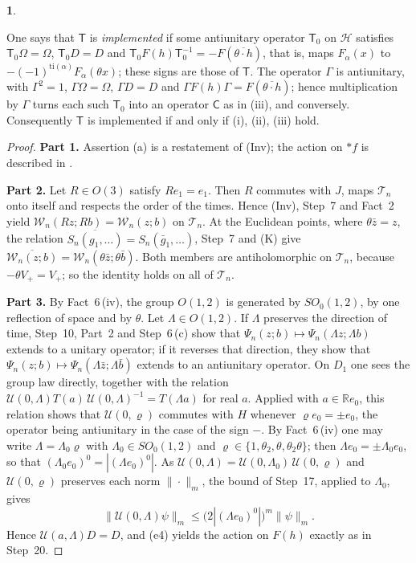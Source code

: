 \documentclass[11pt]{amsart}
\newcommand{\namedhead}{}
\theoremstyle{definition}
\newtheorem*{namedinner}{\namedhead}
\newenvironment{named}[1]{\renewcommand{\namedhead}{#1}\begin{namedinner}}{\end{namedinner}}
\begin{document}
\begin{named}{Proposition 3.5}
\begin{itemize}
One says that $\mathsf T$ is \emph{implemented} if some antiunitary operator $\mathsf T_0$ on $\mathcal H$ satisfies $\mathsf T_0\Omega=\Omega$, $\mathsf T_0D=D$ and $\mathsf T_0F(h)\mathsf T_0^{-1}=-F(\overline{\theta\cdot h})$, that is, maps $F_\alpha(x)$ to $-(-1)^{\mathrm{ti}(\alpha)}F_\alpha(\theta x)$; these signs are those of $\mathsf T$.
The operator $\Gamma$ is antiunitary, with $\Gamma^2=1$, $\Gamma\Omega=\Omega$, $\Gamma D=D$ and $\Gamma F(h)\Gamma=F(\overline{\theta\cdot h})$; hence multiplication by $\Gamma$ turns each such $\mathsf T_0$ into an operator $\mathsf C$ as in (iii), and conversely.
Consequently $\mathsf T$ is implemented if and only if (i), (ii), (iii) hold.
\end{itemize}
\end{named}

\begin{proof}
\textbf{Part 1.}
Assertion (a) is a restatement of (Inv); the action on $\ast f$ is described in \cite[Definition~14.1]{QEDII}.

\textbf{Part 2.}
Let $R\in O(3)$ satisfy $Re_1=e_1$.
Then $R$ commutes with $J$, maps $\mathcal T_n$ onto itself and respects the order of the times.
Hence (Inv), Step~7 and Fact~2 yield $\mathcal W_n(Rz;Rb)=\mathcal W_n(z;b)$ on $\mathcal T_n$.
At the Euclidean points, where $\theta\bar z=z$, the relation $\overline{S_n(g_1,\dots)}=S_n(\bar g_1,\dots)$, Step~7 and (K) give $\overline{\mathcal W_n(z;b)}=\allowbreak \mathcal W_n(\theta\bar z;\theta\bar b)$.
Both members are antiholomorphic on $\mathcal T_n$, because $-\theta V_+=V_+$; so the identity holds on all of $\mathcal T_n$.

\textbf{Part 3.}
By Fact~6\,(iv), the group $O(1,2)$ is generated by $SO_0(1,2)$, by one reflection of space and by $\theta$.
Let $\Lambda\in O(1,2)$.
If $\Lambda$ preserves the direction of time, Step~10, Part~2 and Step~6\,(c) show that $\Psi_n(z;b)\mapsto\Psi_n(\Lambda z;\Lambda b)$ extends to a unitary operator; if it reverses that direction, they show that $\Psi_n(z;b)\mapsto\Psi_n(\Lambda\bar z;\Lambda\bar b)$ extends to an antiunitary operator.
On $D_1$ one sees the group law directly, together with the relation $\mathcal U(0,\allowbreak \Lambda)T(a)\,\allowbreak \mathcal U(0,\allowbreak \Lambda)^{-1}=\allowbreak T(\Lambda a)$ for real $a$.
Applied with $a\in\mathbb Re_0$, this relation shows that $\mathcal U(0,\varrho)$ commutes with $H$ whenever $\varrho e_0=\pm e_0$, the operator being antiunitary in the case of the sign $-$.
By Fact~6\,(iv) one may write $\Lambda=\Lambda_0\varrho$ with $\Lambda_0\in SO_0(1,2)$ and $\varrho\in\{1,\theta_2,\theta,\theta_2\theta\}$; then $\Lambda e_0=\pm\Lambda_0e_0$, so that $(\Lambda_0e_0)^0=|(\Lambda e_0)^0|$.
As $\mathcal U(0,\allowbreak \Lambda)=\allowbreak \mathcal U(0,\allowbreak \Lambda_0)\,\allowbreak \mathcal U(0,\allowbreak \varrho)$ and $\mathcal U(0,\varrho)$ preserves each norm $\|\cdot\|_m$, the bound of Step~17, applied to $\Lambda_0$, gives
\begin{equation*}
\|\mathcal U(0,\Lambda)\psi\|_m\le\bigl(2|(\Lambda e_0)^0|\bigr)^m\|\psi\|_m .
\end{equation*}
Hence $\mathcal U(a,\Lambda)D=D$, and (e4) yields the action on $F(h)$ exactly as in Step~20.


\end{proof}
\end{document}
